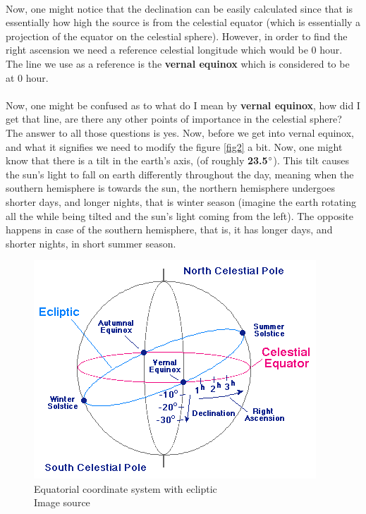 \documentclass[a4paper,twoside]{article}
\numberwithin{equation}{section}
\begin{document}
\paragraph{}
Now, one might notice that the declination can be easily calculated since that is essentially how high the source is from the celestial equator (which is essentially a projection of the equator on the celestial sphere). However, in order to find the right ascension we need a reference celestial longitude which would be 0 hour. The line we use as a reference is the \textbf{vernal equinox} which is considered to be at 0 hour. 
\paragraph{}
Now, one might be confused as to what do I mean by \textbf{vernal equinox}, how did I get that line, are there any other points of importance in the celestial sphere? The answer to all those questions is yes. Now, before we get into vernal equinox, and what it signifies we need to modify the figure \ref{fig2} a bit. Now, one might know that there is a tilt in the earth's axis, (of roughly \textbf{23.5$\degree$}). This tilt causes the sun's light to fall on earth differently throughout the day, meaning when the southern hemisphere is towards the sun, the northern hemisphere undergoes shorter days, and longer nights, that is winter season (imagine the earth rotating all the while being tilted and the sun's light coming from the left). The opposite happens in case of the southern hemisphere, that is, it has longer days, and shorter nights, in short summer season.
\begin{figure}
\begin{center}
\includegraphics[width=0.8\linewidth]{fig3.png} 
\caption{Equatorial coordinate system with ecliptic \\ Image source \cite{equi_coord2}}
\label{fig3}
\end{center}
\end{figure}
\end{document}
